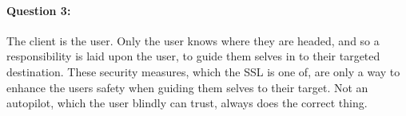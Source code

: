 \documentclass[paper=a4, fontsize=11pt]{scrartcl} %
\numberwithin{equation}{section} %
\numberwithin{figure}{section} %
\numberwithin{table}{section} %
\begin{document}
	\paragraph{Question 3:} The client is the user. Only the user knows where they are headed, and so a responsibility is laid upon the user, to guide them selves in to their targeted destination. These security measures, which the SSL is one of, are only a way to enhance the users safety when guiding them selves to their target. Not an autopilot, which the user blindly can trust, always does the correct thing.
	
	
\end{document}
